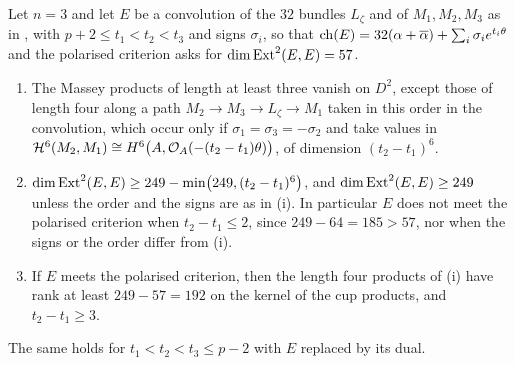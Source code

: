 \begin{theorem}\label{thm:esixdiagonal}
Let $n=3$ and let $E$ be a convolution of the $32$ bundles $L_{\zeta}$ and
of $M_{1},M_{2},M_{3}$ as in , with
$p+2\le t_{1}<t_{2}<t_{3}$ and signs $\sigma_{i}$, so that
$\operatorname{ch}(E)=32(\alpha+\overline{\alpha})+\sum_{i}\sigma_{i}e^{t_{i}\theta}$ and the
polarised criterion asks for $\dim\operatorname{Ext}^{2}(E,E)=57$.
\begin{enumerate}[label=\textup{(\roman*)},leftmargin=2.6em,itemsep=2pt]
\item The Massey products of length at least three vanish on $D^{2}$, except
  those of length four along a path
  $M_{2}\to M_{3}\to L_{\zeta}\to M_{1}$ taken in this order in the
  convolution, which occur only if $\sigma_{1}=\sigma_{3}=-\sigma_{2}$ and
  take values in
  $\mathcal{H}^{6}(M_{2},M_{1})\cong H^{6}\bigl(A,\mathcal{O}_{A}(-(t_{2}-t_{1})\theta)\bigr)$,
  of dimension $(t_{2}-t_{1})^{6}$.
\item $\dim\operatorname{Ext}^{2}(E,E)\ge249-\min\bigl(249,(t_{2}-t_{1})^{6}\bigr)$, and
  $\dim\operatorname{Ext}^{2}(E,E)\ge249$ unless the order and the signs are as in (i).
  In particular $E$ does not meet the polarised criterion when
  $t_{2}-t_{1}\le2$, since $249-64=185>57$, nor when the signs or the order
  differ from (i).
\item If $E$ meets the polarised criterion, then the length four products
  of (i) have rank at least $249-57=192$ on the kernel of the cup products,
  and $t_{2}-t_{1}\ge3$.
\end{enumerate}
The same holds for $t_{1}<t_{2}<t_{3}\le p-2$ with $E$ replaced by its dual.
\end{theorem}

